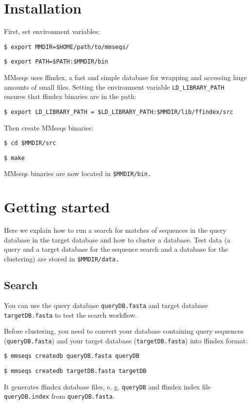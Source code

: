 \documentclass[11pt,a4paper]{report}
\begin{document}
\section{Installation}

First, set environment variables:

\texttt{\$ export MMDIR=\$HOME/path/to/mmseqs/}

\texttt{\$ export PATH=\$PATH:\$MMDIR/bin}

MMseqs uses ffindex, a fast and simple database for wrapping and accessing
huge amounts of small files. Setting the environment variable \texttt{LD\_LIBRARY\_PATH
}ensures that ffindex binaries are in the path:

\texttt{\$ export LD\_LIBRARY\_PATH = \$LD\_LIBRARY\_PATH:\$MMDIR/lib/ffindex/src}

Then create MMseqs binaries:

\texttt{\$ cd \$MMDIR/src}

\texttt{\$ make}

MMseqs binaries are now located in \texttt{\$MMDIR/bin.}


\section{Getting started}

Here we explain how to run a search for matches of sequences in the
query database in the target database and how to cluster a database.
Test data (a query and a target database for the sequence search and
a database for the clustering) are stored in \texttt{\$MMDIR/data.}


\subsection*{Search}

You can use the query database \texttt{queryDB.fasta} and target database
\texttt{targetDB.fasta} to test the search workflow.

Before clustering, you need to convert your database containing query
sequences (\texttt{queryDB.fasta}) and your target database (\texttt{targetDB.fasta})
into ffindex format:

\texttt{\$ mmseqs createdb queryDB.fasta queryDB}

\texttt{\$ mmseqs createdb targetDB.fasta targetDB}
 
It generates ffindex database files, e. g. \texttt{queryDB} and ffindex
index file \texttt{queryDB.index} from \texttt{queryDB.fasta}.
\end{document}
